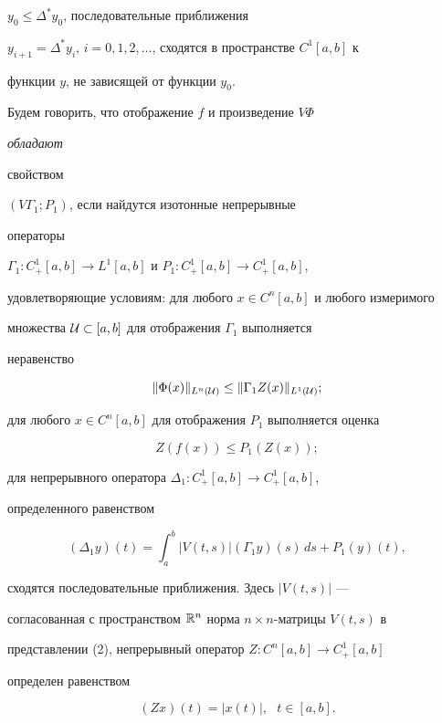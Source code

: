 $y_0\le\Delta^*y_0$, последовательные приближения


$y_{i+1}=\Delta^*y_i$, $i=0,1,2,\dotsc$, сходятся в пространстве $C^1[a,b]$ к


функции $y$, не зависящей от функции $y_0$.





Будем говорить, что отображение $f$ и произведение $V\Phi$ {\it обладают


свойством} $(V{\Gamma}_1;P_1)$, если найдутся изотонные непрерывные


операторы


${\Gamma}_1:C^1_+[a,b]\to L^1[a,b]$ и $P_1:C^1_+[a,b]\to C^1_+[a,b]$,


удовлетворяющие условиям: для любого $x\in C^n[a,b]$ и любого измеримого


множества ${\cal U}\subset[a,b]$ для отображения $\Gamma_1$ выполняется


неравенство


$$


\|\Phi(x)\|_{L^n(\cal U)}\le\|\Gamma_1 Z(x)\|_{L^1(\cal U)};


$$


для любого $x\in C^n[a,b]$ для отображения $P_1$ выполняется оценка


$$


Z(f(x))\le P_1(Z(x));


$$


для непрерывного оператора $\Delta_1:C^1_+[a,b]\to C^1_+[a,b]$,


определенного равенством


\begin{equation}


(\Delta_1y)(t)=\int_a^b|V(t,s)|(\Gamma_1y)


(s)\,ds+P_1(y)(t),


\end{equation}


сходятся последовательные приближения. Здесь $|V(t,s)|$ ---


согласованная с пространством $\Bbb R^n$ норма $n\times n$-матрицы $V(t,s)$ в


представлении (2), непрерывный оператор $Z:C^n[a,b]\to C^1_+[a,b]$


определен равенством


\begin{equation}


(Zx)(t)=| x(t)|,\ \ \ t\in[a,b].


\end{equation}






